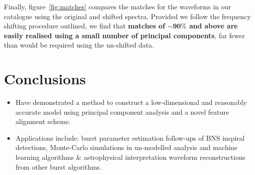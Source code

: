 \documentclass[a0,landscape]{a0poster}
\begin{document}
\begin{multicols}{4}
\begin{minipage}{\columnwidth}
\makeatletter
\newcommand{\@captype}{figure}
\makeatother
\centering
\qquad%
\caption{\emph{Left}: The explained variance as a function of
number of principal components for the original and shifted spectra.  We require
about half as many principal components after applying our shifting procedure.
Much of the variance in the original catalogue arises from a feature, the
location of $f_{\rm peak}$, which is easily aligned.
%
\emph{Right}: Match as a function of number of basis functions used for all waveforms
in the catalogue (vertical axes).  Matches $\sim 90\%$ are achievable with even
a small number of components.}
\label{fig:matches}
\end{minipage}


Finally, figure~\ref{fig:matches} compares the matches for the waveforms in our
catalogue using the original and shifted spectra.  Provided we follow the
frequency shifting procedure outlined, we find that {\bf matches of
    $\mathbf{\sim 90\%}$ and above are easily realised using a small number of
    principal components}, far fewer than would be required using the un-shifted
data.



\vspace{-2cm}
\section*{\centering Conclusions}

\begin{itemize}
\item Have demonstrated a method to construct a low-dimensional and reasonably
    accurate model using principal component analysis and a novel feature
    alignment scheme.
\item Applications include: burst parameter estimation follow-ups of BNS inspiral
    detections, Monte-Carlo simulations in un-modelled analysis
    and machine learning algorithms \& astrophysical interpretation waveform
    reconstructions from other burst algorithms.
\end{itemize}


\end{multicols}
\end{document}
